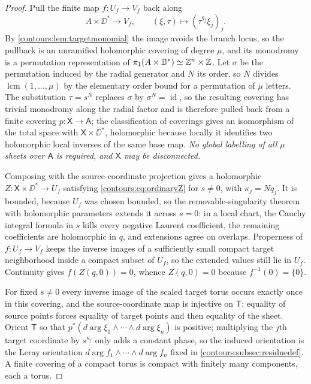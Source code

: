 \documentclass[11pt,letterpaper]{article}
\theoremstyle{definition}
\theoremstyle{remark}
\newcommand{\id}{\operatorname{id}}\newcommand{\vH}{v_{\!H}}
\numberwithin{equation}{section}
\begin{document}
\begin{proof}
Pull the finite map $f:U_f\to V_f$ back along
\[
  A\times\DD^*\longrightarrow V_f,\qquad
  (\xi,\tau)\longmapsto(\tau^{q_j}\xi_j)_j .
\]
By \cref{contours:lem:targetmonomial} the image avoids the branch locus, so the
pullback is an unramified holomorphic covering of degree $\mu$, and its monodromy
is a permutation representation of
$\pi_1(A\times\mathbb D^*)\simeq\mathbb Z^n\times\mathbb Z$. Let $\sigma$ be the permutation induced
by the radial generator and $N$ its order, so $N$ divides
$\operatorname{lcm}(1,\ldots,\mu)$ by the elementary order bound for a
permutation of $\mu$ letters. The substitution $\tau=s^N$ replaces $\sigma$ by
$\sigma^N=\id$, so the resulting covering has trivial monodromy along the radial
factor and is therefore pulled back from a finite covering $p:\mathsf X\to\mathsf A$;
the classification of coverings gives an isomorphism of the total space with
$\mathsf X\times\DD^*$, holomorphic because locally it identifies two
holomorphic local inverses of the same base map. \emph{No global labelling of
all $\mu$ sheets over $\mathsf A$ is required, and $\mathsf X$ may be disconnected.}

Composing with the source-coordinate projection gives a holomorphic
$Z:\mathsf X\times\DD^*\to U_f$ satisfying \eqref{contours:eq:ordinaryZ} for
$s\ne0$, with $\kappa_j=Nq_j$. It is bounded, because $U_f$ was chosen bounded, so
the removable-singularity theorem with holomorphic parameters extends it across
$s=0$: in a local chart, the Cauchy integral formula in $s$ kills every negative
Laurent coefficient, the remaining coefficients are holomorphic in $q$, and
extensions agree on overlaps. Properness of $f:U_f\to V_f$ keeps the inverse
images of a sufficiently small compact target neighborhood inside a compact
subset of $U_f$, so the extended values still lie in $U_f$. Continuity gives
$f(Z(q,0))=0$, whence $Z(q,0)=0$ because $f^{-1}(0)=\{0\}$.

For fixed $s\ne0$ every inverse image of the scaled target torus occurs exactly
once in this covering, and the source-coordinate map is injective on
$\mathsf T$: equality of source points forces equality of target points and then
equality of the sheet. Orient $\mathsf T$ so that
$p^*(d\arg\xi_1\wedge\cdots\wedge d\arg\xi_n)$ is positive; multiplying the
$j$th target coordinate by $s^{\kappa_j}$ only adds a constant phase, so the
induced orientation is the Leray orientation
$d\arg f_1\wedge\cdots\wedge d\arg f_n$ fixed in
\cref{contours:subsec:residuedef}. A finite covering of a compact torus is
compact with finitely many components, each a torus.
\end{proof}
\end{document}
